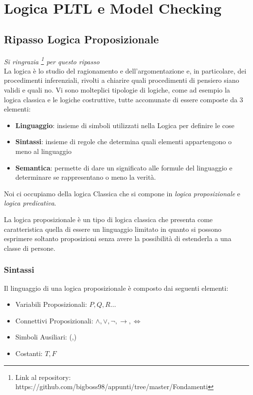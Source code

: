 \documentclass[a4paper,12pt, oneside]{book}
\begin{document}
\chapter{Logica PLTL e Model Checking}
\section{Ripasso Logica Proposizionale}
\emph{Si ringrazia
  \footnote{Link al repository:
    https://github.com/bigboss98/appunti/tree/master/Fondamenti} per questo
  ripasso}\\   
La logica è lo studio del ragionamento e dell’argomentazione e, in particolare,
dei procedimenti inferenziali, rivolti a chiarire quali	procedimenti di pensiero
siano validi e quali no. Vi sono molteplici tipologie di logiche, come ad
esempio la logica classica e le logiche costruttive, tutte accomunate di essere
composte da 3 elementi: 
\begin{itemize}
  \item \textbf{Linguaggio}: insieme di simboli utilizzati nella Logica per
  definire le cose 
  \item \textbf{Sintassi}: insieme di regole che determina quali elementi
  appartengono o meno al linguaggio 
  \item \textbf{Semantica}: permette di dare un significato alle formule del
  linguaggio e determinare se rappresentano o meno la verità.
\end{itemize}

Noi ci occupiamo della logica Classica che si compone in \textit{logica
  proposizionale} e \textit{logica predicativa}.

La logica proposizionale è un tipo di logica classica che presenta come
caratteristica quella di essere un linguaggio limitato in quanto si possono
esprimere soltanto proposizioni senza avere la possibilità di estenderla a una
classe di persone.
\newpage
\subsection{Sintassi}
Il linguaggio di una logica proposizionale è composto dai seguenti elementi:

\begin{itemize}
  \item Variabili Proposizionali: $P,Q,R \dots$
  \item Connettivi Proposizionali: $\land, \lor, \neg, \rightarrow, \iff$
  \item Simboli Ausiliari: (,)
  \item Costanti: $T,F$
\end{itemize}
\end{document}
